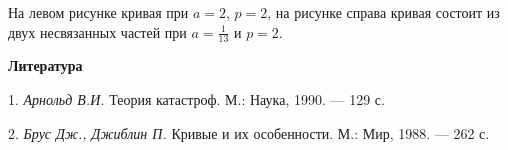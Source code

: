 \documentclass[a5paper,12pt,openbib]{report}
\begin{document}
\begin{figure}[h]
\begin{minipage}[h]{0.49\linewidth}
\end{minipage}
\hfill
\begin{minipage}[h]{0.49\linewidth}
\end{minipage}
\label{ris:image1}
\end{figure}

На левом рисунке кривая при $a=2$, $p=2$, на рисунке справа кривая состоит из двух несвязанных частей  при $a=\frac{1}{13}$ и $p=2$.

\smallskip \centerline{\bf Литература}\nopagebreak

1. {\it Арнольд В.И.} Теория катастроф. М.: Наука, 1990. — 129 с.

2. {\it Брус Дж., Джиблин П.} Кривые и их особенности. М.: Мир, 1988. — 262 с.
\end{document}
